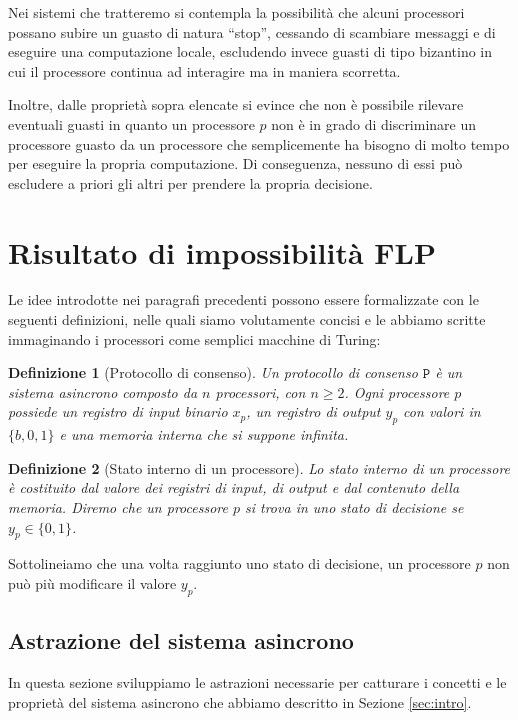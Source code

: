 \documentclass{article}
\newtheorem{definizione}{Definizione}
\begin{document}
Nei sistemi che tratteremo si contempla la possibilità che alcuni
processori possano subire un guasto di natura ``stop'', cessando di
scambiare messaggi e di eseguire una computazione locale, escludendo
invece guasti di tipo bizantino in cui il processore continua ad
interagire ma in maniera scorretta.

Inoltre, dalle proprietà sopra elencate si evince che non è possibile rilevare
eventuali guasti in quanto un processore $p$ non è in grado di
discriminare un processore guasto da un processore che semplicemente
ha bisogno di molto tempo per eseguire la propria computazione. Di
conseguenza, nessuno di essi può escludere a priori gli altri per
prendere la propria decisione.

\section{Risultato di impossibilit\`a FLP}

Le idee introdotte nei paragrafi precedenti possono essere
formalizzate con le seguenti definizioni, nelle quali siamo
volutamente concisi e le abbiamo scritte immaginando i processori come
semplici macchine di Turing:

\begin{definizione}[Protocollo di consenso]
  Un protocollo di consenso $\mathtt{P}$ è un sistema asincrono composto da $n$
  processori, con $n\geq2$. Ogni processore $p$ possiede un registro
  di input binario $x_p$, un registro di output $y_p$ con valori in
  $\{b,0,1\}$ e una memoria interna che si suppone infinita.
\end{definizione}

\begin{definizione}[Stato interno di un processore]
  Lo stato interno di un processore è costituito dal valore dei
  registri di input, di output e dal contenuto della memoria.  Diremo
  che un processore $p$ si trova in uno stato di decisione se $y_p \in
  \lbrace 0,1 \rbrace$. 
\end{definizione}

Sottolineiamo che una volta raggiunto uno stato di decisione, un
processore $p$ non può più modificare il valore $y_p$.

\subsection{Astrazione del sistema asincrono}

In questa sezione sviluppiamo le astrazioni necessarie per catturare i
concetti e le proprietà del sistema asincrono che abbiamo descritto
in Sezione \ref{sec:intro}.
\end{document}
